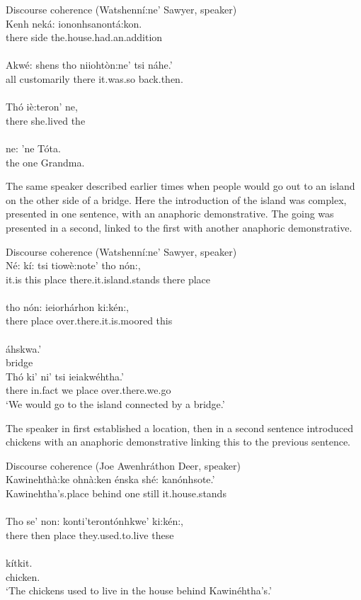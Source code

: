 \documentclass[output=paper,colorlinks,citecolor=brown]{langscibook}
\begin{document}
\ea Discourse coherence (Watshenní:ne' Sawyer, speaker)\\\label{ex:mithun:15}
\gll
Kenh neká: iononhsanontá:kon.\\
there side {the.house.had.an.addition}\\
\medskip\\
\gll Akwé: shens      tho    niiohtòn:ne' tsi náhe.'\\
     all customarily  there {it.was.so}  {back.then}.\\
\medskip\\
\gll Thó iè:teron'       ne,\\
     there  {she.lived}  the\\
\medskip\\
\gll ne: 'ne Tóta.\\
    the one Grandma.\\
\z

The same speaker described earlier times when people would go out to an island on the other side of a bridge. Here the introduction of the island was complex, presented in one sentence, with an anaphoric demonstrative. The going was presented in a second, linked to the first with another anaphoric demonstrative.

\ea Discourse coherence (Watshenní:ne' Sawyer, speaker)\\\label{ex:mithun:16}
\gll Né: kí: tsi tiowè:note' tho nón:,\\
     {it.is} this place {there.it.island.stands} there place\\
\medskip\\
\gll tho nón: ieiorhárhon ki:kén:,\\
     there place {over.there.it.is.moored} this\\
\medskip\\
áhskwa.'\\
bridge\medskip\\
\gll Thó  ki' ni' tsi  ieiakwéhtha.'\\
     there {in.fact}  we place {over.there.we.go}\\
\glt `We would go to the island connected by a bridge.'
\z


The speaker in  first established a location, then in a second sentence introduced chickens with an anaphoric demonstrative linking this to the previous sentence.

\ea Discourse coherence (Joe Awenhráthon Deer, speaker)\\\label{ex:mithun:17}
\gll Kawinehthà:ke ohnà:ken énska shé: kanónhsote.'\\
     {Kawinehtha's.place} behind  one  still {it.house.stands}\\
\medskip\\
\gll Tho se' non: konti'terontónhkwe' ki:kén:,\\
there  then  place {they.used.to.live} these  \\
\medskip\\
\gll  kítkit.\\
chicken.\\
\glt `The chickens used to live in the house behind Kawinéhtha's.'
\z
\end{document}
